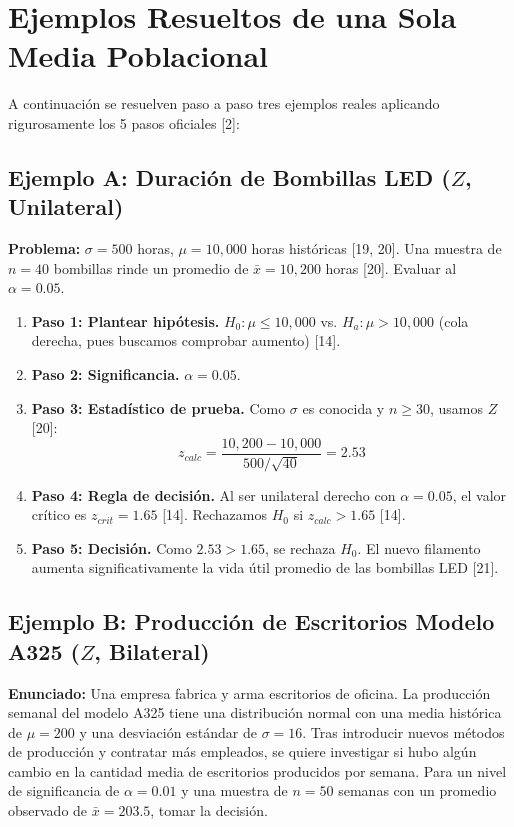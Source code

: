 \documentclass{article}
\begin{document}
\newpage
\section{Ejemplos Resueltos de una Sola Media Poblacional}

A continuación se resuelven paso a paso tres ejemplos reales aplicando rigurosamente los 5 pasos oficiales [2]:

\subsection{Ejemplo A: Duración de Bombillas LED ($Z$, Unilateral)}
\textbf{Problema:} $\sigma = 500$ horas, $\mu = 10,000$ horas históricas [19, 20]. Una muestra de $n = 40$ bombillas rinde un promedio de $\bar{x} = 10,200$ horas [20]. Evaluar al $\alpha = 0.05$.

\begin{enumerate}
    \item \textbf{Paso 1: Plantear hipótesis.} $H_0: \mu \le 10,000$ vs. $H_a: \mu > 10,000$ (cola derecha, pues buscamos comprobar aumento) [14].
    \item \textbf{Paso 2: Significancia.} $\alpha = 0.05$.
    \item \textbf{Paso 3: Estadístico de prueba.} Como $\sigma$ es conocida y $n \ge 30$, usamos $Z$ [20]:
    \[ z_{calc} = \frac{10,200 - 10,000}{500/\sqrt{40}} = 2.53 \]
    \item \textbf{Paso 4: Regla de decisión.} Al ser unilateral derecho con $\alpha=0.05$, el valor crítico es $z_{crit} = 1.65$ [14]. Rechazamos $H_0$ si $z_{calc} > 1.65$ [14].
    \item \textbf{Paso 5: Decisión.} Como $2.53 > 1.65$, se rechaza $H_0$. El nuevo filamento aumenta significativamente la vida útil promedio de las bombillas LED [21].
\end{enumerate}

\subsection{Ejemplo B: Producción de Escritorios Modelo A325 ($Z$, Bilateral)}
\textbf{Enunciado:} Una empresa fabrica y arma escritorios de oficina. La producción semanal del modelo A325 tiene una distribución normal con una media histórica de $\mu = 200$ y una desviación estándar de $\sigma = 16$. Tras introducir nuevos métodos de producción y contratar más empleados, se quiere investigar si hubo algún cambio en la cantidad media de escritorios producidos por semana. Para un nivel de significancia de $\alpha = 0.01$ y una muestra de $n = 50$ semanas con un promedio observado de $\bar{x} = 203.5$, tomar la decisión.
\end{document}
